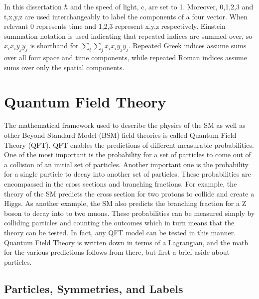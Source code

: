 In this dissertation $\hbar$ and the speed of light, c, are set to 1. Moreover, 0,1,2,3 and t,x,y,z are used interchangeably to label the components of a four vector. When relevant 0 represents time and 1,2,3 represent x,y,z respectively. Einstein summation notation is used indicating that repeated indices are summed over, so $x_ix_i y_jy_j$ is shorthand for $\sum_i\sum_j x_ix_i y_jy_j$. Repeated Greek indices assume sums over all four space and time components, while repeated Roman indices assume sums over only the spatial components. 


\section{Quantum Field Theory}


The mathematical framework used to describe the physics of the SM as well as other Beyond Standard Model (BSM) field theories is called Quantum Field Theory (QFT). QFT enables the predictions of different measurable probabilities. One of the most important is the probability for a set of particles to come out of a collision of an initial set of particles. Another important one is the probability for a single particle to decay into another set of particles. These probabilities are encompassed in the cross sections and branching fractions. For example, the theory of the SM predicts the cross section for two protons to collide and create a Higgs. As another example, the SM also predicts the branching fraction for a Z boson to decay into to two muons. These probabilities can be measured simply by colliding particles and counting the outcomes which in turn means that the theory can be tested. In fact, any QFT model can be tested in this manner. Quantum Field Theory is written down in terms of a Lagrangian, and the math for the various predictions follows from there, but first a brief aside about particles. 

\subsection{Particles, Symmetries, and Labels}


